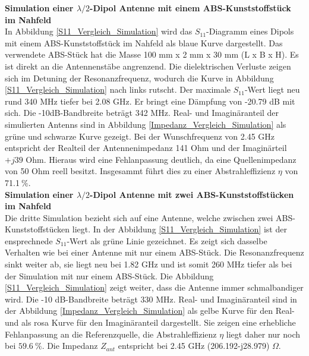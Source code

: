\textbf{Simulation einer $\lambda/2$-Dipol Antenne mit einem ABS-Kunststoffstück im Nahfeld}\\
In Abbildung \ref{S11_Vergleich_Simulation} wird das $S_{11}$-Diagramm eines Dipols mit einem ABS-Kunststoffstück im Nahfeld als blaue Kurve dargestellt. Das verwendete ABS-Stück hat die Masse 100 mm x 2 mm x 30 mm (L x B x H). Es ist direkt an die Antennenstäbe angrenzend. Die dielektrischen Verluste zeigen sich im Detuning der Resonanzfrequenz, wodurch die Kurve in Abbildung \ref{S11_Vergleich_Simulation} nach links rutscht. Der maximale $S_{11}$-Wert liegt neu rund 340 MHz tiefer bei 2.08 GHz. Er bringt eine Dämpfung von -20.79 dB mit sich. Die -10dB-Bandbreite beträgt 342 MHz. Real- und Imaginäranteil der simulierten Antenns sind in Abbildung \ref{Impedanz_Vergleich_Simulation} als grüne und schwarze Kurve gezeigt. Bei der Wunschfrequenz von 2.45 GHz entspricht der Realteil der Antennenimpedanz 141 Ohm und der Imaginärteil  $+j39$ Ohm. Hieraus wird eine Fehlanpassung deutlich, da eine Quellenimpedanz von 50 Ohm reell besitzt. Insgesammt führt dies zu einer Abstrahleffizienz $\eta$ von 71.1$\ \%$.\\

\textbf{Simulation einer $\lambda/2$-Dipol Antenne mit zwei ABS-Kunststoffstücken im Nahfeld}\\
Die dritte Simulation bezieht sich auf eine Antenne, welche  zwischen zwei ABS-Kunststoffstücken liegt. In der Abbildung \ref{S11_Vergleich_Simulation} ist der ensprechnede $S_{11}$-Wert als grüne Linie gezeichnet. Es zeigt sich dasselbe Verhalten wie bei einer Antenne mit nur einem ABS-Stück. Die Resonanzfrequenz sinkt weiter ab, sie liegt neu bei 1.82 GHz und ist somit 260 MHz tiefer als bei der Simulation mit nur einem ABS-Stück. Die Abbildung \ref{S11_Vergleich_Simulation} zeigt weiter, dass die Antenne immer schmalbandiger wird. Die -10 dB-Bandbreite beträgt 330 MHz. Real- und Imaginäranteil sind in der Abbildung \ref{Impedanz_Vergleich_Simulation} als gelbe Kurve für den Real- und als rosa Kurve für den Imaginäranteil dargestellt. Sie zeigen eine erhebliche Fehlanpassung an die Referenzquelle, die Abstrahleffizienz $\eta$ liegt daher nur noch bei $59.6 \ \%$. Die Impedanz $Z_{ant}$ entspricht bei 2.45 GHz (206.192-j28.979) $\Omega$.\\




